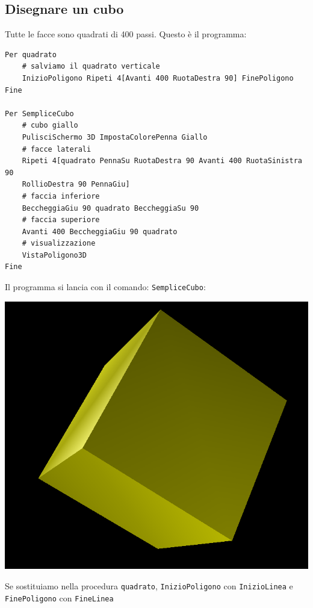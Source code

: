 \subsection{Disegnare un cubo}
\noindent Tutte le facce sono quadrati di 400 passi. Questo è il programma:
\begin{lstlisting}[caption="Disegno di un cubo in 3D"]
Per quadrato
	# salviamo il quadrato verticale
	InizioPoligono Ripeti 4[Avanti 400 RuotaDestra 90] FinePoligono
Fine

Per SempliceCubo
	# cubo giallo
	PulisciSchermo 3D ImpostaColorePenna Giallo
	# facce laterali
	Ripeti 4[quadrato PennaSu RuotaDestra 90 Avanti 400 RuotaSinistra 90 
	RollioDestra 90 PennaGiu]
	# faccia inferiore
	BeccheggiaGiu 90 quadrato BeccheggiaSu 90
	# faccia superiore
	Avanti 400 BeccheggiaGiu 90 quadrato
	# visualizzazione
	VistaPoligono3D
Fine
\end{lstlisting}
Il programma si lancia con il comando: \texttt{SempliceCubo}:
\begin{center}
	\includegraphics*[scale=0.4]{pics/3dCube1.png}
\end{center}
Se sostituiamo nella procedura \texttt{quadrato}, \texttt{InizioPoligono} con \texttt{InizioLinea} e \texttt{FinePoligono} con \texttt{FineLinea}
